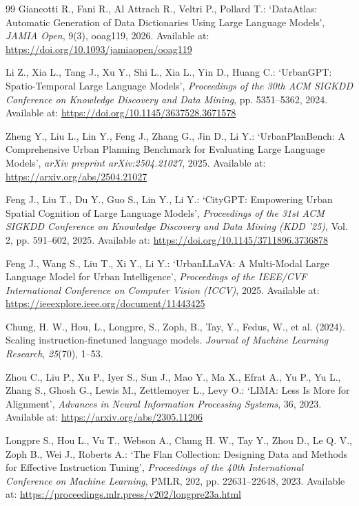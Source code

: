 \documentclass[a4paper,fleqn]{cas-sc}
\begin{document}
\begin{thebibliography}{99}
Giancotti R., Fani R., Al Attrach R., Veltri P., Pollard T.:
`DataAtlas: Automatic Generation of Data Dictionaries Using Large Language Models',
\textit{JAMIA Open}, 9(3), ooag119, 2026.
Available at: \url{https://doi.org/10.1093/jamiaopen/ooag119}

Li Z., Xia L., Tang J., Xu Y., Shi L., Xia L., Yin D., Huang C.:
`UrbanGPT: Spatio-Temporal Large Language Models',
\textit{Proceedings of the 30th ACM SIGKDD Conference on Knowledge Discovery and Data Mining}, pp. 5351--5362, 2024.
Available at: \url{https://doi.org/10.1145/3637528.3671578}

Zheng Y., Liu L., Lin Y., Feng J., Zhang G., Jin D., Li Y.:
`UrbanPlanBench: A Comprehensive Urban Planning Benchmark for Evaluating Large Language Models',
\textit{arXiv preprint arXiv:2504.21027}, 2025.
Available at: \url{https://arxiv.org/abs/2504.21027}

Feng J., Liu T., Du Y., Guo S., Lin Y., Li Y.:
`CityGPT: Empowering Urban Spatial Cognition of Large Language Models',
\textit{Proceedings of the 31st ACM SIGKDD Conference on Knowledge Discovery and Data Mining (KDD '25)}, Vol. 2, pp. 591--602, 2025.
Available at: \url{https://doi.org/10.1145/3711896.3736878}

Feng J., Wang S., Liu T., Xi Y., Li Y.:
`UrbanLLaVA: A Multi-Modal Large Language Model for Urban Intelligence',
\textit{Proceedings of the IEEE/CVF International Conference on Computer Vision (ICCV)}, 2025.
Available at: \url{https://ieeexplore.ieee.org/document/11443425}

Chung, H. W., Hou, L., Longpre, S., Zoph, B., Tay, Y.,
Fedus, W., et al. (2024).
Scaling instruction-finetuned language models.
\textit{Journal of Machine Learning Research},
\textit{25}(70), 1--53.

Zhou C., Liu P., Xu P., Iyer S., Sun J., Mao Y., Ma X., Efrat A., Yu P., Yu L., Zhang S., Ghosh G., Lewis M., Zettlemoyer L., Levy O.:
`LIMA: Less Is More for Alignment',
\textit{Advances in Neural Information Processing Systems}, 36, 2023.
Available at: \url{https://arxiv.org/abs/2305.11206}

Longpre S., Hou L., Vu T., Webson A., Chung H. W., Tay Y., Zhou D., Le Q. V., Zoph B., Wei J., Roberts A.:
`The Flan Collection: Designing Data and Methods for Effective Instruction Tuning',
\textit{Proceedings of the 40th International Conference on Machine Learning},
PMLR, 202, pp. 22631--22648, 2023.
Available at: \url{https://proceedings.mlr.press/v202/longpre23a.html}


\end{thebibliography}
\end{document}
